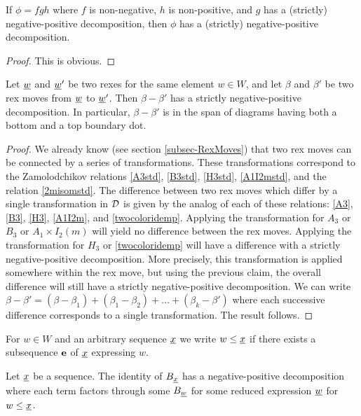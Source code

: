 \begin{claim} If $\phi = fgh$ where $f$ is non-negative, $h$ is non-positive, and $g$ has a (strictly) negative-positive decomposition, then $\phi$ has a (strictly) negative-positive
decomposition. \end{claim}

\begin{proof} This is obvious. \end{proof}

\begin{lemma} \label{rexmovesmlt} Let ${\underline{w}}$ and ${\underline{w}}'$ be two rexes for the same element $w \in W$, and let $\beta$ and $\beta'$ be two rex moves from ${\underline{w}}$ to ${\underline{w}}'$. Then $\beta -
\beta'$ has a strictly negative-positive decomposition. In particular, $\beta -
\beta'$ is in the span of diagrams having both a bottom and a top boundary dot.\end{lemma}

\begin{proof} We already know (see section \ref{subsec-RexMoves}) that two rex moves can be connected by a series of transformations. These transformations correspond to the Zamolodchikov
relations \eqref{A3std}, \eqref{B3std}, \eqref{H3std}, \eqref{A1I2mstd}, and the relation \eqref{2misomstd}. The difference between two rex moves which differ by a single transformation in
${\mathcal{D}}$ is given by the analog of each of these relations: \eqref{A3}, \eqref{B3}, \eqref{H3}, \eqref{A1I2m}, and \eqref{twocoloridemp}. Applying the transformation for $A_3$ or $B_3$ or
$A_1 \times I_2(m)$ will yield no difference between the rex moves. Applying the transformation for $H_3$ or \eqref{twocoloridemp} will have a difference with a strictly negative-positive
decomposition. More precisely, this transformation is applied somewhere within the rex move, but using the previous claim, the overall difference will still have a strictly
negative-positive decomposition. We can write $\beta - \beta' = (\beta - \beta_1) + (\beta_1 - \beta_2) + \ldots +(\beta_k -\beta')$ where each successive difference corresponds to a
single transformation. The result follows. \end{proof}

For $w \in W$ and an arbitrary sequence ${\underline{x}}$ we write $w \le {\underline{x}}$ if there exists a subsequence ${\mathbf e}$ of ${\underline{x}}$ expressing $w$.

\begin{lemma} \label{rexesonlyplz} Let ${\underline{x}}$ be a sequence. The identity of $B_{\underline{x}}$ has a negative-positive decomposition where each term factors through some $B_{\underline{w}}$ for some reduced
expression ${\underline{w}}$ for $w \le {\underline{x}}$. \end{lemma}

